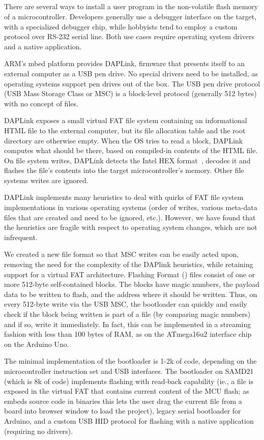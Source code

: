 \subsection{\UF}
\label{sec:uf2}

There are several ways to install a user program in the non-volatile flash memory
of a microcontroller. Developers generally use a debugger
interface on the target, with a specialized debugger chip,
while hobbyists tend to employ a custom protocol over RS-232 serial
line. Both use cases require operating system drivers and a native application.

ARM's mbed platform provides DAPLink, firmware that presents itself to an external computer
as a USB pen drive. No special drivers need to be installed, as operating
systems support pen drives out of the box. The USB pen drive protocol (USB Mass
Storage Class or MSC) is a block-level protocol (generally 512 bytes) with no
concept of files.

DAPLink exposes a small virtual FAT file system containing an informational HTML file
to the external computer,
but its file allocation table and the root directory are otherwise empty.
When the OS tries to read a block, DAPLink computes what should be there,
based on compiled-in contents of the HTML file.
On file system writes, DAPLink detects the Intel HEX format~\cite{IntelHEX},
decodes it and flashes the file's contents into the target microcontroller's memory.
Other file systems writes are ignored.

DAPLink implements many heuristics to deal with quirks of FAT file
system implementations in various operating systems (order of writes, various meta-data files
that are created and need to be ignored, etc.).  However, we have found that the
heuristics are fragile with respect to operating system changes, which are not infrequent.

We created a new file format so that MSC writes can be easily acted upon, removing
the need for the complexity of the DAPlink heuristics, while retaining support for
a virtual FAT architecture.
Flashing Format (\UF) files consist of one or more 512-byte self-contained blocks.
The blocks have magic numbers, the payload data to be written to flash,
and the address where it should be written.
Thus, on every 512-byte write via the USB MSC, the bootloader can quickly and easily
check if the block being written is part of a \UF file (by comparing magic numbers)
and if so, write it immediately. In fact, this can be implemented in a streaming
fashion with less than 100 bytes of RAM, as on the ATmega16u2 interface chip
on the Arduino Uno.

The minimal implementation of the \UF bootloader is 1-2k of code, depending
on the microcontroller instruction set and USB interfaces.
The bootloader on SAMD21 (which is 8k of code) implements \UF flashing with read-back capability (ie.,
a \UF file is exposed in the virtual FAT that contains current content of the
MCU flash; as \MC embeds source code in binaries this lets the user drag the current \UF file from
a board into \MC browser window to load the project), legacy serial bootloader for Arduino,
and a custom USB HID protocol for flashing with a native application (requiring no drivers).

